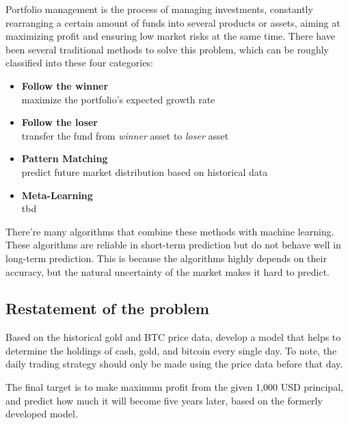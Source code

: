 \documentclass{mcmthesis}
\begin{document}
Portfolio management is the process of managing investments,
constantly rearranging a certain amount of funds into several products or assets,
aiming at maximizing profit and ensuring low market risks at the same time.
There have been several traditional methods to solve this problem,
which can be roughly classified into these four categories\cite{li2014online}:

\begin{itemize}
  \item \textbf{Follow the winner}\\
  maximize the portfolio's expected growth rate
  \item \textbf{Follow the loser}\\
  transfer the fund from \textit{winner} asset to \textit{loser} asset
  \item \textbf{Pattern Matching}\\
  predict future market distribution based on historical data
  \item \textbf{Meta-Learning}\\
  tbd
\end{itemize}

There're many algorithms that combine these methods with machine learning.
These algorithms are reliable in short-term prediction
but do not behave well in long-term prediction.
This is because the algorithms highly depends on their accuracy,
but the natural uncertainty of the market makes it hard to predict.

\subsection{Restatement of the problem}

Based on the historical gold and BTC price data,
develop a model that helps to determine the holdings of cash, gold, and bitcoin every single day.
To note, the daily trading strategy should only be made using the price data before that day.

The final target is to make maximum profit from the given 1,000 USD principal,
and predict how much it will become five years later, based on the formerly developed model.


\end{document}
